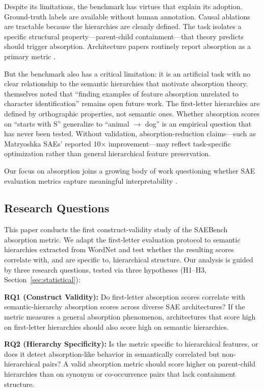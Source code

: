 \documentclass{article}
\begin{document}
Despite its limitations, the benchmark has virtues that explain its adoption. Ground-truth labels are available without human annotation. Causal ablations are tractable because the hierarchies are cleanly defined. The task isolates a specific structural property---parent-child containment---that theory predicts should trigger absorption. Architecture papers routinely report absorption as a primary metric \citep{bussmann2025matryoshka}.

But the benchmark also has a critical limitation: it is an artificial task with no clear relationship to the semantic hierarchies that motivate absorption theory. \citet{chanin2024feature} themselves noted that ``finding examples of feature absorption unrelated to character identification'' remains open future work. The first-letter hierarchies are defined by orthographic properties, not semantic ones. Whether absorption scores on ``starts with S'' generalize to ``animal $\to$ dog'' is an empirical question that has never been tested. Without validation, absorption-reduction claims---such as Matryoshka SAEs' reported 10$\times$ improvement---may reflect task-specific optimization rather than general hierarchical feature preservation.

Our focus on absorption joins a growing body of work questioning whether SAE evaluation metrics capture meaningful interpretability \citep{kantamneni2025saebaseline}.

\subsection{Research Questions}

This paper conducts the first construct-validity study of the SAEBench absorption metric. We adapt the first-letter evaluation protocol to semantic hierarchies extracted from WordNet \citep{miller1995wordnet} and test whether the resulting scores correlate with, and are specific to, hierarchical structure. Our analysis is guided by three research questions, tested via three hypotheses (H1--H3, Section~\ref{sec:statistical}):

\textbf{RQ1 (Construct Validity):} Do first-letter absorption scores correlate with semantic-hierarchy absorption scores across diverse SAE architectures? If the metric measures a general absorption phenomenon, architectures that score high on first-letter hierarchies should also score high on semantic hierarchies.

\textbf{RQ2 (Hierarchy Specificity):} Is the metric specific to hierarchical features, or does it detect absorption-like behavior in semantically correlated but non-hierarchical pairs? A valid absorption metric should score higher on parent-child hierarchies than on synonym or co-occurrence pairs that lack containment structure.
\end{document}
